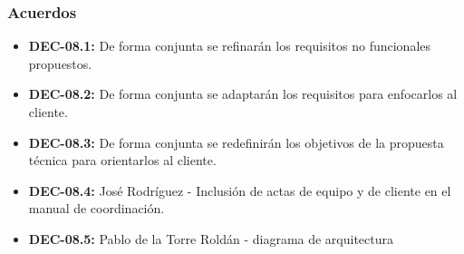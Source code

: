\subsubsection{Acuerdos}
\begin{itemize}[leftmargin=*]
  \item \textbf{DEC-08.1:} De forma conjunta se refinarán los requisitos no funcionales propuestos. 
  \item \textbf{DEC-08.2:} De forma conjunta se adaptarán los requisitos para enfocarlos al cliente.
  \item \textbf{DEC-08.3:} De forma conjunta se redefinirán los objetivos de la propuesta técnica para orientarlos al cliente.
  \item \textbf{DEC-08.4:} José Rodríguez - Inclusión de actas de equipo y de cliente en el manual de coordinación.
  \item \textbf{DEC-08.5:} Pablo de la Torre Roldán - diagrama de arquitectura
\end{itemize}

